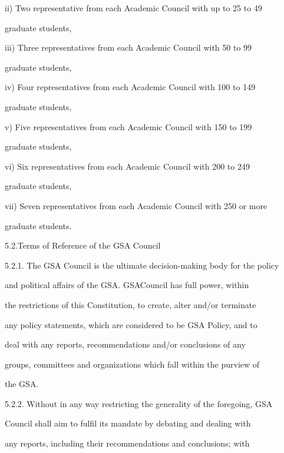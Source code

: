 \documentclass{article}
\begin{document}
ii)     Two representative from each Academic Council with up to 25 to 49  

graduate students,  



iii)    Three  representatives  from  each  Academic  Council  with  50  to  99  

graduate students,  



iv)     Four  representatives  from  each  Academic  Council  with  100  to  149  

graduate students,  



v)      Five  representatives  from  each  Academic  Council  with  150  to  199  

graduate students,  



vi)     Six  representatives  from  each  Academic  Council  with  200  to  249  

graduate students,  



vii)    Seven representatives from each Academic Council with 250 or more  

graduate students.  



5.2.Terms of Reference of the GSA Council  



5.2.1. The GSA Council is the ultimate decision-making body for the policy  

and political affairs of  the  GSA. GSACouncil  has  full power,  within  

the  restrictions  of  this  Constitution,  to  create,  alter  and/or  terminate  

any policy statements, which are considered to be GSA Policy, and to  

deal  with  any  reports,  recommendations  and/or  conclusions  of  any  

groups, committees and organizations which fall within the purview of  

the GSA.  



5.2.2. Without  in  any  way  restricting  the  generality  of  the  foregoing,  GSA  

Council  shall  aim  to  fulfil  its  mandate  by  debating  and  dealing  with  

any  reports,  including  their  recommendations  and  conclusions;  with  
\end{document}
